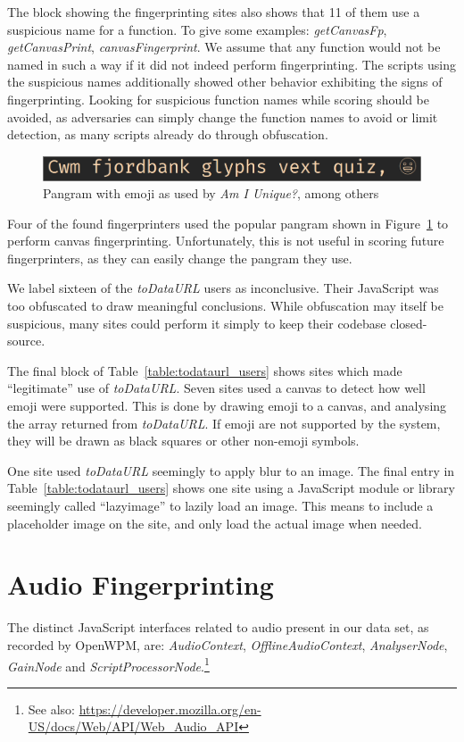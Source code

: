 \documentclass[
    fontsize=12pt,
    headings=small,
    parskip=half,
    bibliography=totoc,
    numbers=noenddot,
    open=any
    ]{scrreprt}
\begin{document}
The block showing the fingerprinting sites also shows that 11 of them
use a suspicious name for a function. To give some examples:
\textit{getCanvasFp}, \textit{getCanvasPrint}, \textit{canvasFingerprint}.
We assume that any function would not be named in such a way if it did not
indeed perform fingerprinting.
The scripts using the suspicious names additionally showed other behavior
exhibiting the signs of fingerprinting.
Looking for suspicious function names while scoring should be avoided,
as adversaries can simply change the function names to avoid or
limit detection, as many scripts already do through obfuscation.

\begin{figure}
\centering
\includegraphics[scale=0.4]{images/fjordbank.png}
\caption{Pangram with emoji as used by \textit{Am I Unique?}, among others}
\label{code:pangram}
\end{figure}

Four of the found fingerprinters used the popular pangram shown in
Figure~\ref{code:pangram} to perform canvas fingerprinting.
Unfortunately, this is not useful in scoring future fingerprinters,
as they can easily change the pangram they use.

We label sixteen of the \textit{toDataURL} users as inconclusive.
Their JavaScript was too obfuscated to draw meaningful conclusions.
While obfuscation may itself be suspicious, many sites could perform
it simply to keep their codebase closed-source.

The final block of Table~\ref{table:todataurl_users} shows sites which
made ``legitimate'' use of \textit{toDataURL}. Seven sites used a canvas
to detect how well emoji were supported. This is done by drawing emoji
to a canvas, and analysing the array returned from \textit{toDataURL}.
If emoji are not supported by the system, they will be drawn as black
squares or other non-emoji symbols.

One site used \textit{toDataURL} seemingly to apply blur to an image.
The final entry in Table~\ref{table:todataurl_users} shows one site
using a JavaScript module or library seemingly called ``lazyimage''
to lazily load an image. This means to include a placeholder
image on the site, and only load the actual image when needed.


\section{Audio Fingerprinting}
The distinct JavaScript interfaces related to audio present in our data set,
as recorded by OpenWPM, are:
\textit{AudioContext},
\textit{OfflineAudioContext},
\textit{AnalyserNode},
\textit{GainNode} and \textit{ScriptProcessorNode}.\footnote{See also: \url{https://developer.mozilla.org/en-US/docs/Web/API/Web_Audio_API}}
\end{document}
